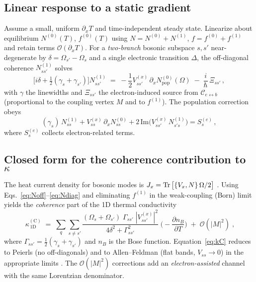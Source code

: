 \documentclass[12pt]{article}
\begin{document}
\subsection{Linear response to a static gradient}
Assume a small, uniform $\partial_x T$ and time-independent steady state. Linearize about equilibrium $N^{(0)}(T)$, $f^{(0)}(T)$ using $N=N^{(0)}+N^{(1)}$, $f=f^{(0)}+f^{(1)}$ and retain terms $\mathcal O(\partial_xT)$. For a \emph{two-branch} bosonic subspace $s,s'$ near-degenerate by $\delta=\Omega_{s'}-\Omega_s$ and a single electronic transition $\Delta$, the off-diagonal coherence $N^{(1)}_{ss'}$ solves
\begin{equation}
\Big[i\delta + \tfrac12(\gamma_s+\gamma_{s'})\Big] N^{(1)}_{ss'}
\;=\; -\frac{1}{2} V^{(x)}_{ss'}\, \partial_x N^{(0)}_{\mathrm{pop}}(\Omega) \; -\; \frac{i}{\hbar}\,\Xi_{ss'}\,,
\label{eq:Noff}
\end{equation}
with $\gamma$ the linewidths and $\Xi_{ss'}$ the electron-induced source from $\mathcal C_{e\leftrightarrow b}$ (proportional to the coupling vertex $M$ and to $f^{(1)}$). The population correction obeys
\begin{equation}
(\gamma_s)\, N^{(1)}_{ss} + V^{(x)}_{ss}\,\partial_x N^{(0)}_{ss} + 2\,\mathrm{Im}\big( V^{(x)}_{ss'}\,N^{(1)}_{s's}\big) = S^{(e)}_s\,,
\label{eq:Ndiag}
\end{equation}
where $S^{(e)}_s$ collects electron-related terms.


\subsection{Closed form for the coherence contribution to $\kappa$}
The heat current density for bosonic modes is $J_x= \Tr\big[ \{V_x, N\}\,\Omega/2 \big]$ \cite{Hardy1963,Simoncelli2019Unified}. Using Eqs.~\eqref{eq:Noff}--\eqref{eq:Ndiag} and eliminating $f^{(1)}$ in the weak-coupling (Born) limit yields the \emph{coherence} part of the 1D thermal conductivity
\begin{equation}
\boxed{\;\kappa^{(\mathrm C)}_{\!\,1\mathrm D}\;=\;\sum_{q}\sum_{s\neq s'} \frac{(\Omega_s+\Omega_{s'})\;\Gamma_{ss'}\; |V^{(x)}_{ss'}|^2}{4\delta^2+\Gamma_{ss'}^2}\;\bigg(-\frac{\partial n_B}{\partial T}\bigg)\; +\; \mathcal O(|M|^2)\;,}\label{eq:kC}
\end{equation}
where $\Gamma_{ss'}\!=\!\tfrac12(\gamma_s+\gamma_{s'})$ and $n_B$ is the Bose function. Equation~\eqref{eq:kC} reduces to Peierls (no off-diagonals) and to Allen--Feldman (flat bands, $V_{ss}\!\to\!0$) in the appropriate limits \cite{Peierls1929,AllenFeldman1993,Simoncelli2019Unified}. The $\mathcal O(|M|^2)$ corrections add an \emph{electron-assisted} channel with the same Lorentzian denominator.
\end{document}
